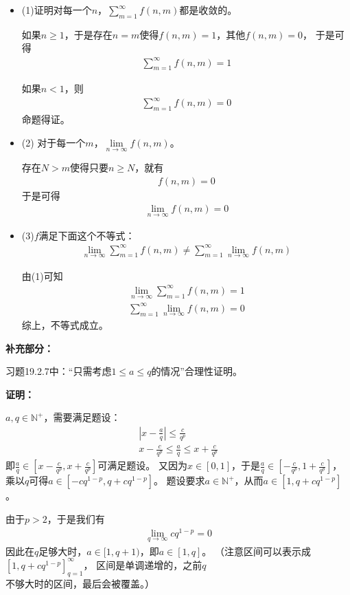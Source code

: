 \documentclass{article}
\begin{document}
\begin{itemize}
  \item (1)证明对每一个$n$，$\sum\limits_{m=1}^\infty  f(n, m)$都是收敛的。

        如果$n \geq 1$，于是存在$n = m$使得$f(n, m) = 1$，其他$f(n, m) = 0$，
        于是可得
        \begin{align*}
          \sum\limits_{m=1}^\infty  f(n, m) = 1
        \end{align*}

        如果$n < 1$，则
        \begin{align*}
          \sum\limits_{m=1}^\infty  f(n, m) = 0
        \end{align*}
        命题得证。

  \item (2) 对于每一个$m$，$\lim\limits_{n \to \infty} f(n, m)$。

        存在$N > m$使得只要$n  \geq N$，就有
        \begin{align*}
          f(n, m) = 0
        \end{align*}
        于是可得
        \begin{align*}
          \lim\limits_{n \to \infty} f(n, m) = 0
        \end{align*}

  \item (3)$f$满足下面这个不等式：
        \begin{align*}
          \lim\limits_{n \to \infty} \sum\limits_{m = 1}^{\infty} f(n,m)
          \neq \sum\limits_{m = 1}^{\infty} \lim\limits_{n \to \infty} f(n, m)
        \end{align*}

        由(1)可知
        \begin{align*}
          \lim\limits_{n \to \infty} \sum\limits_{m = 1}^{\infty} f(n,m) = 1 \\
          \sum\limits_{m = 1}^{\infty} \lim\limits_{n \to \infty} f(n, m) = 0
         \end{align*}
         综上，不等式成立。
\end{itemize}

\textbf{补充部分：}

\begin{zremark}
  习题19.2.7中：“只需考虑$1 \leq a \leq q$的情况”合理性证明。
\end{zremark}

\textbf{证明：}

$a, q \in \mathbb{N}^+$，需要满足题设：
\begin{align*}
  |x - \frac{a}{q}| \leq \frac{c}{q^p} \\
  x - \frac{c}{q^p} \leq \frac{a}{q} \leq x + \frac{c}{q^p}
\end{align*}
即$\frac{a}{q} \in [x - \frac{c}{q^p}, x + \frac{c}{q^p}]$可满足题设。
又因为$x \in [0, 1]$，于是$\frac{a}{q} \in [- \frac{c}{q^p}, 1 + \frac{c}{q^p}]$，
乘以$q$可得$a \in [-cq^{1 - p}, q + cq^{1 - p}]$。
题设要求$a \in \mathbb{N}^+$，从而$a \in [1, q + cq^{1 - p}]$。

由于$p > 2$，于是我们有
\begin{align*}
  \lim\limits_{q \to \infty} cq^{1 - p} = 0
\end{align*}
因此在$q$足够大时，$a \in [1, q + 1)$，即$a \in [1, q]$。
（注意区间可以表示成$[1, q + cq^{1 - p}]_{q = 1}^\infty$，
区间是单调递增的，之前$q$不够大时的区间，最后会被覆盖。）
\end{document}

